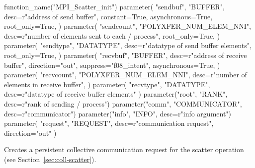 \begin{mpi-binding}
    function_name("MPI_Scatter_init")
    parameter(
        "sendbuf",
        "BUFFER",
        desc=r"address of send buffer",
        constant=True,
        asynchronous=True,
        root_only=True,
    )
    parameter(
        "sendcount",
        "POLYXFER_NUM_ELEM_NNI",
        desc=r"number of elements sent to each \MPI/ process",
        root_only=True,
    )
    parameter(
        "sendtype",
        "DATATYPE",
        desc=r"datatype of send buffer elements",
        root_only=True,
    )
    parameter(
        "recvbuf",
        "BUFFER",
        desc=r"address of receive buffer",
        direction="out",
        suppress="f08_intent",
        asynchronous=True,
    )
    parameter(
        "recvcount",
        "POLYXFER_NUM_ELEM_NNI",
        desc=r"number of elements in receive buffer",
    )
    parameter(
        "recvtype", "DATATYPE", desc=r"datatype of receive buffer elements"
    )
    parameter("root", "RANK", desc=r"rank of sending \MPI/ process")
    parameter("comm", "COMMUNICATOR", desc=r"communicator")
    parameter("info", "INFO", desc=r"info argument")
    parameter(
        "request", "REQUEST", desc=r"communication request", direction="out"
    )
\end{mpi-binding}

Creates a persistent collective communication request for the scatter operation
(see Section~\ref{sec:coll-scatter}).

